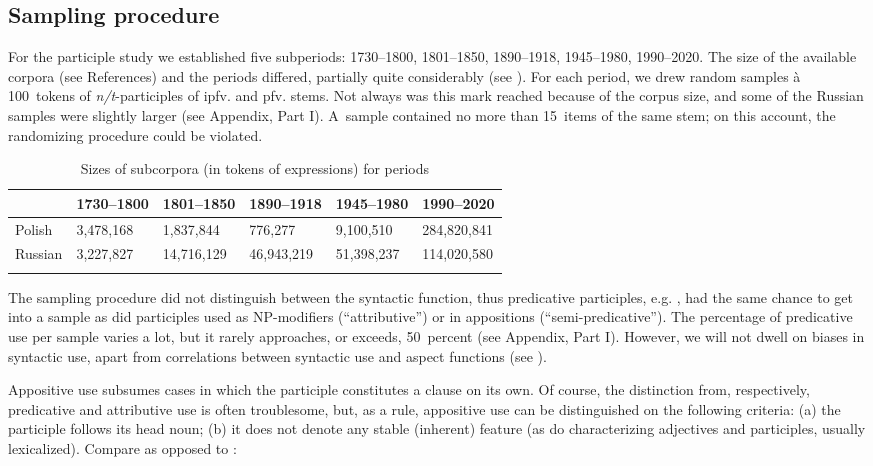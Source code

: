 \documentclass[output=paper]{langscibook}
\begin{document}
\subsection{Sampling procedure}\label{wiem:sec:sampling-procedure}

For the participle study we established five subperiods: 1730--1800, 1801--1850, 1890--1918, 1945--1980, 1990--2020. The size of the available corpora (see References) and the periods differed, partially quite considerably (see ). For each period, we drew random samples à 100~tokens of \textit{n/t}-participles of ipfv. and pfv. stems. Not always was this mark reached because of the corpus size, and some of the Russian samples were slightly larger (see Appendix, Part I). A~sample contained no more than 15~items of the same stem; on this account, the randomizing procedure could be violated.

\begin{table}
\begin{tabularx}{\textwidth}{lY@{~~}Y@{~~}Y@{~~}Y@{~~}Y}
\lsptoprule
& 1730--1800 & 1801--1850 & 1890--1918 & 1945--1980 & 1990--2020\\
\midrule
Polish & 3,478,168 & 1,837,844 & 776,277 & 9,100,510 & 284,820,841\\
Russian & 3,227,827 & 14,716,129 & 46,943,219 & 51,398,237 & 114,020,580\\
\lspbottomrule
\end{tabularx}
\caption{Sizes of subcorpora (in tokens of expressions) for periods}
\label{wiem:tab:sizes-subcorpora}
\end{table}

The sampling procedure did not distinguish between the syntactic function, thus predicative participles, e.g.  , had the same chance to get into a sample as did participles used as NP-modifiers (``attributive'') or in appositions (``semi-predicative''). The percentage of predicative use per sample varies a lot, but it rarely approaches, or exceeds, \qty{50}{percent} (see Appendix, Part I). However, we will not dwell on biases in syntactic use, apart from correlations between syntactic use and aspect functions (see ).\largerpage[1]

Appositive use subsumes cases in which the participle constitutes a clause on its own. Of course, the distinction from, respectively, predicative and attributive use is often troublesome, but, as a rule, appositive use can be distinguished on the following criteria: (a) the participle follows its head noun; (b) it does not denote any stable (inherent) feature (as do characterizing adjectives and participles, usually lexicalized). Compare  as opposed to :
\end{document}
